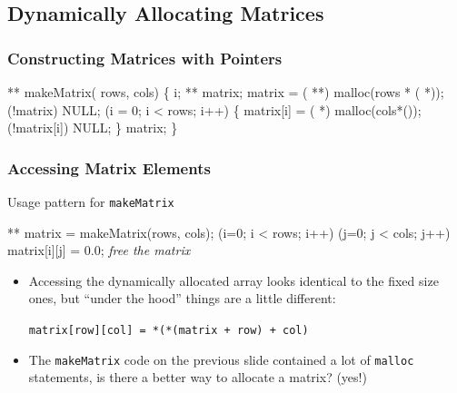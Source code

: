 \documentclass[smaller,handout,table]{beamer}
\begin{document}
\subsection{Dynamically Allocating Matrices}
\begin{frame}[fragile]
\frametitle{Constructing Matrices with Pointers}
\vspace{-0.2in}
\begin{semiverbatim}
\footnotesize
\kr\kl{} ** makeMatrix( rows,  cols)
\kl\{
\kl   {} i;
\kl   {} ** matrix;
\kl        
\kl   matrix = ( **) malloc(rows * ( *));
\kl   {} (!matrix)  NULL; 
\kl
\kl   {} (i = 0; i < rows; i++)
\kl   \{
\kl      matrix[i] = ( *) malloc(cols*());
\kl      {} (!matrix[i])
\kl         {} NULL;  
\kl                         {}
\kl   \}
\kl
\kl   {} matrix;
\kl\}
\end{semiverbatim}
\end{frame}

\begin{frame}[fragile]
\frametitle{Accessing Matrix Elements}
\begin{block}{Usage pattern for {\tt makeMatrix}}
\begin{semiverbatim}
 ** matrix = makeMatrix(rows, cols);
 (i=0; i < rows; i++)
    (j=0; j < cols; j++)
      matrix[i][j] = 0.0;
\emph{free the matrix}      
\end{semiverbatim}
\end{block}
\begin{itemize}
\item Accessing the dynamically allocated array looks identical to the fixed size ones, but ``under the hood'' things are a little different:
\begin{alertblock}{}
\begin{center}
\tt matrix[row][col] = *(*(matrix + row) + col)
\end{center}
\end{alertblock}
\item The {\tt makeMatrix} code on the previous slide contained a lot of {\tt malloc} statements, is there a better way to allocate a matrix? (yes!)
\end{itemize}
\end{frame}
\end{document}
